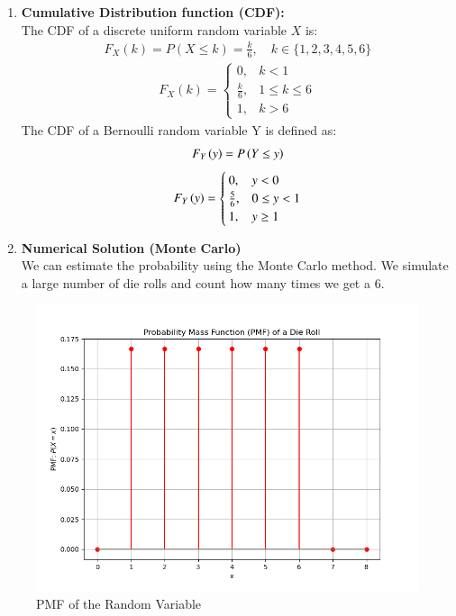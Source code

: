 \documentclass[journal]{IEEEtran}
\numberwithin{equation}{enumi}
\numberwithin{figure}{enumi}
\begin{document}
\begin{enumerate}
    \item \textbf{Cumulative Distribution function (CDF):}\\
    The CDF of a discrete uniform random variable $X$ is:
    \begin{align}
        F_X(k) = P(X \leq k) = \frac{k}{6}, \quad k \in \{1,2,3,4,5,6\}
    \end{align}
    \begin{align}
        F_X(k) = \begin{cases}
            0, & k < 1 \\
            \frac{k}{6}, & 1 \leq k \leq 6 \\
            1, & k > 6
        \end{cases}
    \end{align}
    The CDF of a Bernoulli random variable Y is defined as:\\
    \begin{align}
    	F_Y\left(y\right) = P\left(Y \leq y\right)
    \end{align}
    \begin{align}
            F_Y\left(y\right) = \begin{cases}
                    0, & y < 0 \\
    \frac{5}{6}, & 0 \leq y < 1 \\
    1, & y \geq 1
            \end{cases}
    \end{align}

\item \textbf{Numerical Solution (Monte Carlo)}\\
We can estimate the probability using the Monte Carlo method.  We simulate a large number of die rolls and count how many times we get a 6.
\end{enumerate}
\begin{figure}[H]
    \centering
    \includegraphics[width=\columnwidth]{figs/pmf_die.png}
    \caption{PMF of the Random Variable}
    \label{fig:enter-label}
\end{figure}
\end{document}
